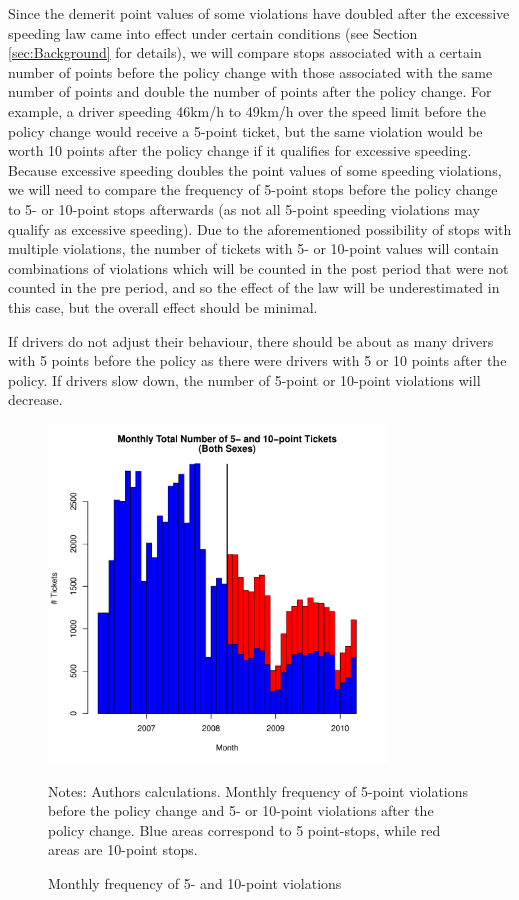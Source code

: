 Since the demerit point values of some violations have doubled 
after the excessive speeding law came into effect 
under certain conditions (see Section \ref{sec:Background} for details), 
we will compare stops associated with a certain number of points 
before the policy change with those associated with the 
same number of points and double the number of points after the policy change. 
For example, a driver speeding 46km/h to 49km/h over the speed limit 
before the policy change would receive a 5-point ticket, 
but the same violation would be worth 10 points after the policy change 
if it qualifies for excessive speeding. 
Because excessive speeding doubles the point values of some speeding violations, 
we will need to compare the frequency of 5-point stops before the policy change 
to 5- or 10-point stops afterwards 
(as not all 5-point speeding violations may qualify as excessive speeding). 
Due to the aforementioned possibility of stops with multiple violations, 
the number of tickets with 5- or 10-point values will contain 
combinations of violations which will be counted in the post period 
that were not counted in the pre period, and so the effect of the law 
will be underestimated in this case, but the overall effect should be minimal.

If drivers do not adjust their behaviour, 
there should be about as many drivers with 5 points before the policy 
as there were drivers with 5 or 10 points after the policy. 
If drivers slow down, the number of 5-point or 10-point violations will decrease. %



\begin{figure}
\centering
\includegraphics[width=0.8\textwidth]{Figures/num_pts_5_10_all_orig.pdf}
\caption{Monthly frequency of 5- and 10-point violations }
Notes: Authors calculations. 
Monthly frequency of 5-point violations before the policy change 
and 5- or 10-point violations after the policy change. 
Blue areas correspond to 5 point-stops, while red areas are 10-point stops.
\label{fig:num_pts_5_10_all}
\end{figure}


